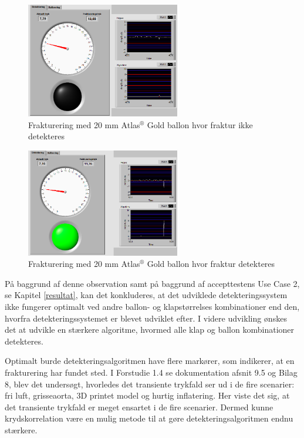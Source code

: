 \begin{figure}[H]
	\centering
	\includegraphics[width=0.6\textwidth]{Figure/20ikke}
	\caption{Frakturering med 20 mm Atlas$^\circledR$ Gold ballon hvor fraktur ikke detekteres}
    \label{20ikke}
\end{figure}

\begin{figure}[H]
	\centering
	\includegraphics[width=0.6\textwidth]{Figure/20detekt}
	\caption{Frakturering med 20 mm Atlas$^\circledR$ Gold ballon hvor fraktur detekteres}
    \label{20detekt}
\end{figure}

På baggrund af denne observation samt på baggrund af accepttestens Use Case 2, se Kapitel \ref{resultat}, kan det konkluderes, at det udviklede detekteringssystem ikke fungerer optimalt ved andre ballon- og klapstørrelses kombinationer end den, hvorfra detekteringssystemet er blevet udviklet efter. I videre udvikling ønskes det at udvikle en stærkere algoritme, hvormed alle klap og ballon kombinationer detekteres. 


Optimalt burde detekteringsalgoritmen have flere markører, som indikerer, at en frakturering har fundet sted. I Forstudie 1.4 se dokumentation afsnit 9.5 og Bilag 8, blev det undersøgt, hvorledes det transiente trykfald ser ud i de fire scenarier: fri luft, grisseaorta, 3D printet model og hurtig inflatering. Her viste det sig, at det transiente trykfald er meget ensartet i de fire scenarier. Dermed kunne krydskorrelation være en mulig metode til at gøre detekteringsalgoritmen endnu stærkere. 

